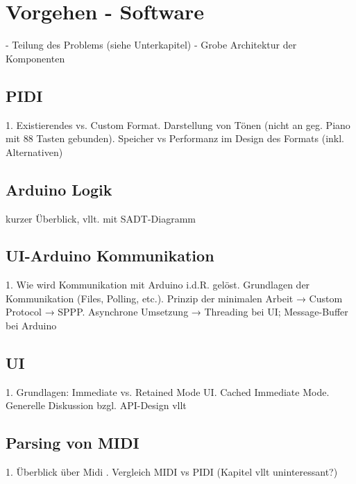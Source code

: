 \chapter{Vorgehen - Software} \label{vorgehenSW}

\nocite{*}
- Teilung des Problems (siehe Unterkapitel) \newline
- Grobe Architektur der Komponenten

\section{PIDI}
1. Existierendes vs. Custom Format. Darstellung von Tönen (nicht an geg. Piano mit 88 Tasten gebunden). Speicher vs Performanz im Design des Formats (inkl. Alternativen)

\section{Arduino Logik}
kurzer Überblick, vllt. mit SADT-Diagramm

\section{UI-Arduino Kommunikation}
1. Wie wird Kommunikation mit Arduino i.d.R. gelöst. Grundlagen der Kommunikation (Files, Polling, etc.). Prinzip der minimalen Arbeit → Custom Protocol → SPPP. Asynchrone Umsetzung → Threading bei UI; Message-Buffer bei Arduino

\section{UI}
1. Grundlagen: Immediate vs. Retained Mode UI. Cached Immediate Mode. Generelle Diskussion bzgl. API-Design vllt

\section{Parsing von MIDI}
1. Überblick über Midi . Vergleich MIDI vs PIDI \newline
(Kapitel vllt uninteressant?)
